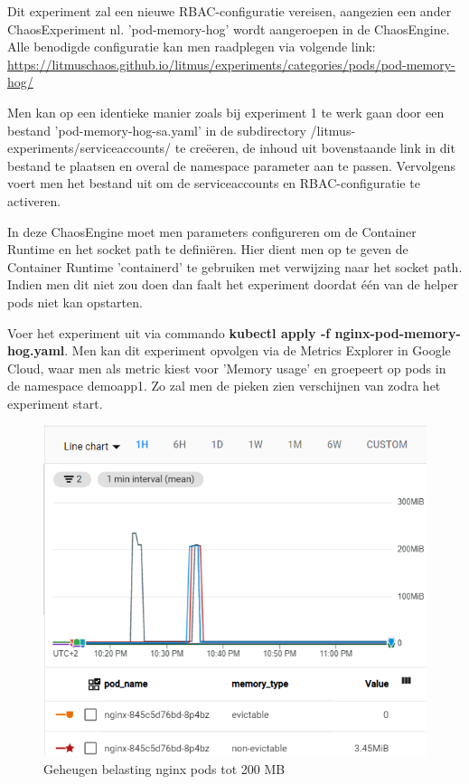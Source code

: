 Dit experiment zal een nieuwe RBAC-configuratie vereisen, aangezien een ander ChaosExperiment nl. 'pod-memory-hog' wordt aangeroepen in de ChaosEngine. Alle benodigde configuratie kan men raadplegen via volgende link:
\url{https://litmuschaos.github.io/litmus/experiments/categories/pods/pod-memory-hog/}

Men kan op een identieke manier zoals bij experiment 1 te werk gaan door een bestand 'pod-memory-hog-sa.yaml' in de subdirectory /litmus-experiments/serviceaccounts/ te creëeren, de inhoud uit bovenstaande link in dit bestand te plaatsen en overal de namespace parameter aan te passen. Vervolgens voert men het bestand uit om de serviceaccounts en RBAC-configuratie te activeren.  

 In deze ChaosEngine moet men parameters configureren om de Container Runtime en het socket path te definiëren. Hier dient men op te geven de Container Runtime 'containerd' te gebruiken met verwijzing naar het socket path. Indien men dit niet zou doen dan faalt het experiment doordat één van de helper pods niet kan opstarten.  

Voer het experiment uit via commando {\bf kubectl apply -f nginx-pod-memory-hog.yaml}. Men kan dit experiment opvolgen via de Metrics Explorer in Google Cloud, waar men als metric kiest voor 'Memory usage' en groepeert op pods in de namespace demoapp1. Zo zal men de pieken zien verschijnen van zodra het experiment start. 

\begin{figure}[h]
    \centering
    \includegraphics[scale=.7]{img/memory_spikes.png}
    \caption{Geheugen belasting nginx pods tot 200 MB}
\end{figure}


